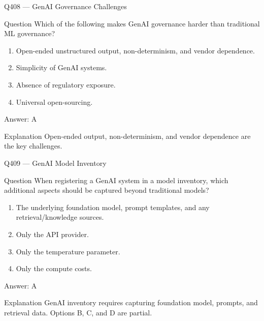 \documentclass[aspectratio=169,8pt]{beamer}
\begin{document}
	\begin{frame}{Q408 --- GenAI Governance Challenges}
		\begin{block}{Question}
			Which of the following makes GenAI governance harder than traditional ML governance?
			\begin{enumerate}
				\item Open-ended unstructured output, non-determinism, and vendor dependence.
				\item Simplicity of GenAI systems.
				\item Absence of regulatory exposure.
				\item Universal open-sourcing.
			\end{enumerate}
		\end{block}
		\begin{exampleblock}{Answer: A}\end{exampleblock}
		\begin{block}{Explanation}
			Open-ended output, non-determinism, and vendor dependence are the key challenges.
		\end{block}
	\end{frame}
	
	\begin{frame}{Q409 --- GenAI Model Inventory}
		\begin{block}{Question}
			When registering a GenAI system in a model inventory, which additional aspects should be captured beyond traditional models?
			\begin{enumerate}
				\item The underlying foundation model, prompt templates, and any retrieval/knowledge sources.
				\item Only the API provider.
				\item Only the temperature parameter.
				\item Only the compute costs.
			\end{enumerate}
		\end{block}
		\begin{exampleblock}{Answer: A}\end{exampleblock}
		\begin{block}{Explanation}
			GenAI inventory requires capturing foundation model, prompts, and retrieval data. Options B, C, and D are partial.
		\end{block}
	\end{frame}
	
\end{document}
